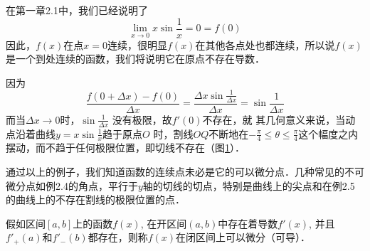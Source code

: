 \begin{solution}
在第一章2.1中，我们已经说明了
\[\lim_{x\to 0}x\sin\frac{1}{x}=0=f(0)\]
因此，$f(x)$在点$x=0$连续，很明显$f(x)$在其他各点处也都连续，所以说$f(x)$是一个到处连续的函数，我们将说明它在原点不存在导数．

因为
\[\frac{f(0+\Delta x)-f(0)}{\Delta x}=\frac{\Delta x\sin\frac{1}{\Delta x}}{\Delta x}=\sin\frac{1}{\Delta x}\]
而当$\Delta x\to 0$时，$\sin\frac{1}{\Delta x}$
没有极限，故$f'(0)$不存在，就
其几何意义来说，当动点沿着曲线$y=x\sin\frac{1}{x}$趋于原点$O$
时，割线$OQ$不断地在$-\frac{\pi}{4}\le \theta\le \frac{\pi}{4}$这个幅度之内摆动，而不趋于任何极限位置，即切线不存在（图\ref{fig:x*sin(1/x)}）．
\end{solution}

\begin{figure}[htp]
    \centering
{}
    \caption{}\label{fig:x*sin(1/x)}
\end{figure}

通过以上的例子，我们知道函数的连续点未必是它的可以微分点．几种常见的不可微分点如例2.4的角点，平行于$y$轴的切线的切点，特别是曲线上的尖点和在例2.5的曲线上的不存在割线的极限位置的点．

假如区间$[a,b]$上的函数$f(x)$, 在开区间$(a,b)$中存在着导数$f'(x)$, 并且$f'_+(a)$和$f'_-(b)$都存在，则称$f(x)$在闭区间上可以微分（可导）．

